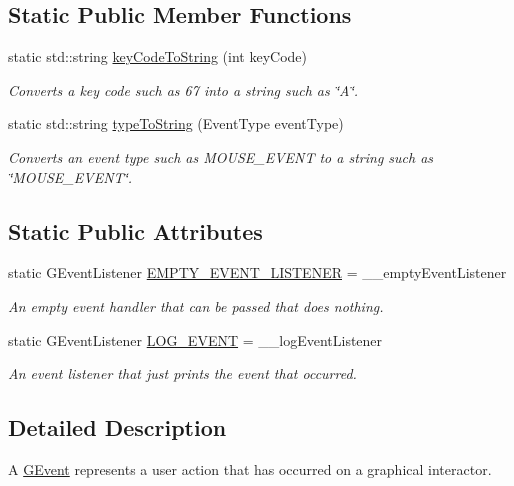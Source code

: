 \subsection*{Static Public Member Functions}
\begin{DoxyCompactItemize}
\item 
static std\+::string \mbox{\hyperlink{classGEvent_a6e882459d29785fb753a3bf23f29cbc3}{key\+Code\+To\+String}} (int key\+Code)
\begin{DoxyCompactList}\small\item\em Converts a key code such as 67 into a string such as \char`\"{}\+A\char`\"{}. \end{DoxyCompactList}\item 
static std\+::string \mbox{\hyperlink{classGEvent_abfc45737c7f2e261401203a0c959c103}{type\+To\+String}} (Event\+Type event\+Type)
\begin{DoxyCompactList}\small\item\em Converts an event type such as M\+O\+U\+S\+E\+\_\+\+E\+V\+E\+NT to a string such as \char`\"{}\+M\+O\+U\+S\+E\+\_\+\+E\+V\+E\+N\+T\char`\"{}. \end{DoxyCompactList}\end{DoxyCompactItemize}
\subsection*{Static Public Attributes}
\begin{DoxyCompactItemize}
\item 
static G\+Event\+Listener \mbox{\hyperlink{classGEvent_ad4e5235f4489609eefdb603ed8d19c3d}{E\+M\+P\+T\+Y\+\_\+\+E\+V\+E\+N\+T\+\_\+\+L\+I\+S\+T\+E\+N\+ER}} = \+\_\+\+\_\+empty\+Event\+Listener
\begin{DoxyCompactList}\small\item\em An empty event handler that can be passed that does nothing. \end{DoxyCompactList}\item 
static G\+Event\+Listener \mbox{\hyperlink{classGEvent_ad9cb77a13a97c2de6a7f1bcb09f961ed}{L\+O\+G\+\_\+\+E\+V\+E\+NT}} = \+\_\+\+\_\+log\+Event\+Listener
\begin{DoxyCompactList}\small\item\em An event listener that just prints the event that occurred. \end{DoxyCompactList}\end{DoxyCompactItemize}


\subsection{Detailed Description}
A \mbox{\hyperlink{classGEvent}{G\+Event}} represents a user action that has occurred on a graphical interactor. 

